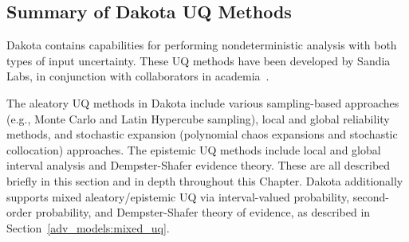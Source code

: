 \subsection{Summary of Dakota UQ Methods}\label{uq:overview:methods}

Dakota contains capabilities for performing nondeterministic analysis
with both types of input uncertainty. These UQ methods have been
developed by Sandia Labs, in conjunction with collaborators in
academia~\cite{Gha99,Gha91,Eld05,Tang10a}.

The aleatory UQ methods in Dakota include various sampling-based
approaches (e.g., Monte Carlo and Latin Hypercube sampling), local and
global reliability methods, and stochastic expansion (polynomial chaos
expansions and stochastic collocation) approaches. The epistemic UQ
methods include local and global interval analysis and Dempster-Shafer
evidence theory. These are all described briefly in this section and
in depth throughout this Chapter. Dakota additionally supports mixed
aleatory/epistemic UQ via interval-valued probability, second-order
probability, and Dempster-Shafer theory of evidence, as described in
Section~\ref{adv_models:mixed_uq}.



